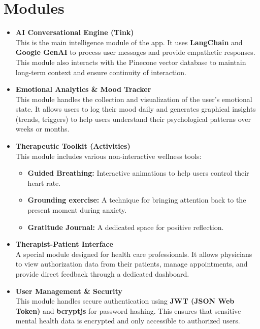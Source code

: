 \documentclass[a4paper,12pt]{report}
\begin{document}
\section{Modules}
\begin{itemize}
    \item \textbf{AI Conversational Engine (Tink)}\\
    This is the main intelligence module of the app. It uses \textbf{LangChain} and \textbf{Google GenAI} to process user messages and provide empathetic responses. This module also interacts with the Pinecone vector database to maintain long-term context and ensure continuity of interaction.
    
    \item \textbf{Emotional Analytics \& Mood Tracker}\\
    This module handles the collection and visualization of the user's emotional state. It allows users to log their mood daily and generates graphical insights (trends, triggers) to help users understand their psychological patterns over weeks or months.
    
    \item \textbf{Therapeutic Toolkit (Activities)}\\
    This module includes various non-interactive wellness tools:
    \begin{itemize}
        \item \textbf{Guided Breathing:} Interactive animations to help users control their heart rate.
        \item \textbf{Grounding exercise:} A technique for bringing attention back to the present moment during anxiety.
        \item \textbf{Gratitude Journal:} A dedicated space for positive reflection.
    \end{itemize}
    
    \item \textbf{Therapist-Patient Interface}\\
    A special module designed for health care professionals. It allows physicians to view authorization data from their patients, manage appointments, and provide direct feedback through a dedicated dashboard.
    
    \item \textbf{User Management \& Security}\\
    This module handles secure authentication using \textbf{JWT (JSON Web Token)} and \textbf{bcryptjs} for password hashing. This ensures that sensitive mental health data is encrypted and only accessible to authorized users.
\end{itemize}
\end{document}
